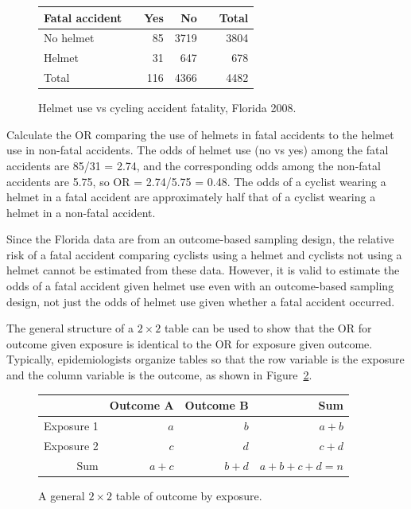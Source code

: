 \begin{figure}[h]
	\centering
	\begin{tabular}{ll rrr r}
		\hline
		Fatal accident	 & \hspace{2mm} & Yes & No & \hspace{2mm} & Total \\
		\hline
		No helmet & & 85 & 3719  &  & 3804  \\
		Helmet &	& 31 & 647 &  & 678  \\
        Total & & 116 & 4366 & & 4482 \\
		\hline
	\end{tabular}
	\caption{Helmet use vs cycling accident fatality, Florida 2008.}
    \label{figure:helmetUseBicycleAccidents}
\end{figure}	

\begin{examplewrap}
  \begin{nexample}{Calculate the OR comparing the use of helmets in fatal accidents to the helmet use in non-fatal accidents.} \label{orHelmetUseFatalAccident}
    The odds of helmet use (no vs yes) among the fatal accidents are 85/31 = 2.74, and the corresponding odds among the non-fatal accidents are 5.75, so OR = 2.74/5.75 = 0.48.  The odds of a cyclist  wearing a helmet in a fatal accident are approximately half that of a cyclist wearing a helmet in a non-fatal accident. 
\end{nexample}
\end{examplewrap}

Since the Florida data are from an outcome-based sampling design, the relative risk of a fatal accident comparing cyclists using a helmet and cyclists not using a helmet cannot be estimated from these data. However, it is valid to estimate the odds of a fatal accident given helmet use even with an outcome-based sampling design, not just the odds of helmet use given whether a fatal accident occurred.

The general structure of a $2 \times 2$ table can be used to show that the OR for outcome given exposure is identical to the OR for exposure given outcome.  Typically, epidemiologists organize tables so that the row variable is the exposure and the column variable is the outcome, as shown in Figure~\ref{figure:generalTwoByTwoTable}.
\begin{figure}[h!]
	\centering
	\begin{tabular}{r|rrr}
		\hline
		& Outcome A & Outcome B & Sum\\ 
		\hline
		Exposure 1 & $a$ & $b$ & $a + b$ \\ 
		Exposure 2 & $c$ & $d$ & $c + d$ \\
		Sum & $a + c$ & $b + d$ & $a + b + c + d = n$ \\
		\hline
	\end{tabular}	
  \caption{A general $2 \times 2$ table of outcome by exposure.}
  \label{figure:generalTwoByTwoTable}
  \end{figure}

